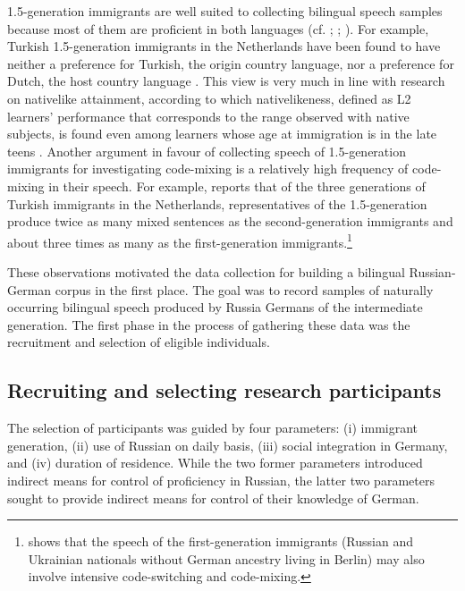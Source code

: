 1.5-generation immigrants are well suited to collecting bilingual speech samples because most of them are proficient in both languages (cf. \citealt[43]{backus-patterns-1992}; \citealt[36--38]{halmari-government-1997}; \citealt[160--167]{boumans-syntax-1998}). For example, Turkish 1.5-gen\-er\-a\-tion immigrants in the Netherlands have been found to have neither a preference for Turkish, the origin country language, nor a preference for Dutch, the host country language \citep[201]{backus06}. This view is very much in line with research on nativelike attainment, according to which nativelikeness, defined as L2 learners' performance that corresponds to the range observed with native subjects, is found even among learners whose age at immigration is in the late teens \citep[121]{birdsong2009}. Another argument in favour of collecting speech of 1.5-generation immigrants for investigating code-mixing is a relatively high frequency of code-mixing in their speech. For example, \citet[][263]{backus1999} reports that of the three generations of Turkish immigrants in the Netherlands, representatives of the 1.5-generation produce twice as many mixed sentences as the second-generation immigrants and about three times as many as the first-generation immigrants.\footnote{\citet{goldbach05} shows that the speech of the first-generation immigrants (Russian and Ukrainian nationals without German ancestry living in Berlin) may also involve intensive code-switching and code-mixing.} 

These observations motivated the data collection for building a bilingual Rus\-sian-German corpus in the first place. The goal was to record samples of naturally occurring bilingual speech produced by Russia Germans of the intermediate generation. The first phase in the process of gathering these data was the recruitment and selection of  eligible individuals.

\subsection{Recruiting and selecting research participants}\largerpage[-1]

The selection of participants was guided by four parameters: ({i}) immigrant generation, ({ii}) use of Russian on daily basis, ({iii}) social integration in Germany, and ({iv}) duration of residence. While the two former parameters introduced indirect means for control of proficiency in Russian, the latter two parameters sought to provide indirect means for control of their knowledge of German. 

